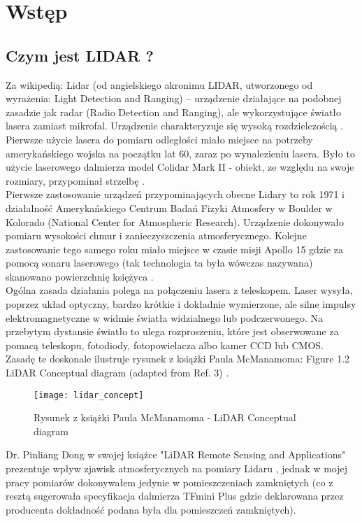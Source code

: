 \section {Wstęp}
\subsection {Czym jest LIDAR ?}

Za wikipedią:
Lidar (od angielskiego akronimu LIDAR, utworzonego od wyrażenia: Light Detection and Ranging)
– urządzenie działające na podobnej zasadzie jak radar (Radio Detection and Ranging), ale
wykorzystujące światło lasera zamiast mikrofal. Urządzenie charakteryzuje się wysoką
rozdzielczością \cite{lidar_pl}.\\

Pierwsze użycie lasera do pomiaru odległości miało miejsce na potrzeby amerykańskiego 
wojska na początku lat 60, zaraz po wynalezieniu lasera. Było to użycie laserowego dalmierza 
model Colidar Mark II - obiekt, ze względu na swoje rozmiary, przypominał strzelbę \cite{lidar_en}.\\

Pierwsze zastosowanie urządzeń przypominających obecne Lidary to rok 1971 i działalność
Amerykańskiego Centrum Badań Fizyki Atmosfery w Boulder w Kolorado (National Center for
Atmospheric Research). Urządzenie dokonywało pomiaru wysokości chmur i zanieczyszczenia
atmosferycznego. Kolejne zastosowanie tego samego roku miało miejsce w czasie misji
Apollo 15 gdzie za pomocą sonaru laserowego (tak technologia ta była wówczas nazywana)
skanowano powierzchnię księżyca \cite{lidar_en}.\\

Ogólna zasada działania polega na połączeniu lasera z teleskopem. Laser wysyła, poprzez 
układ optyczny, bardzo krótkie i dokładnie wymierzone, ale silne impulsy elektromagnetyczne
w widmie światła widzialnego lub podczerwonego. Na przebytym dystansie światło to ulega
rozproszeniu, które jest obserwowane za pomacą teleskopu, fotodiody, fotopowielacza albo
kamer CCD lub CMOS. \\

Zasadę te doskonale ilustruje rysunek z książki Paula McManamoma:
Figure 1.2 LiDAR Conceptual diagram (adapted from Ref. 3) \cite{mcmanamom}.\\
\begin{figure}[h]
    \centering
    \texttt{[image: lidar\_concept]}
    \caption{Rysunek z książki Paula McManamoma - LiDAR Conceptual diagram}
    \label{fig:lidar_concept}
\end{figure}


Dr. Pinliang Dong w swojej książce "LiDAR Remote Sensing and Applications" prezentuje 
wpływ zjawisk atmosferycznych na pomiary Lidaru \cite{dong}, jednak w mojej pracy pomiarów dokonywałem
jedynie w pomieszczeniach zamkniętych (co z resztą sugerowała specyfikacja dalmierza TFmini
Plus gdzie deklarowana przez producenta dokładność podana była dla pomieszczeń zamkniętych).\\